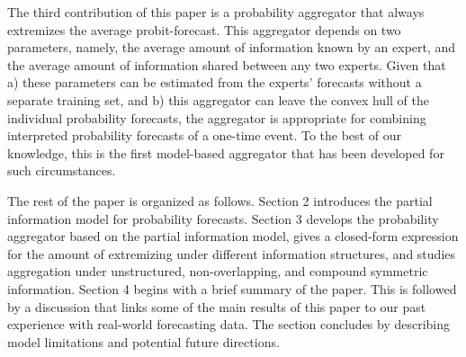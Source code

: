 \documentclass[11pt]{article}
\theoremstyle{definition}
\theoremstyle{definition}
\begin{document}
The third contribution of this paper is a probability aggregator that always extremizes the average probit-forecast. This aggregator depends on two parameters, namely, the average amount of information known by an expert, and the average amount of information shared between any two experts. Given that a) these parameters can be estimated from the experts' forecasts without a separate training set, and b) this aggregator can leave the convex hull of the individual probability forecasts, the aggregator is appropriate for combining interpreted probability forecasts of a one-time event. To the best of our knowledge, this is the first model-based aggregator that has been developed for such circumstances.

 
 
 












The rest of the paper is organized as follows. Section 2 introduces the partial information model for probability forecasts. Section 3 develops the probability aggregator based on the partial information model, gives a closed-form expression for the amount of extremizing under different information structures, and studies aggregation under unstructured, non-overlapping, and compound symmetric information. Section 4 begins with a brief summary of the paper. This is followed by a discussion that links some of the main results of this paper to our past experience with real-world forecasting data. The section concludes by describing model limitations and potential future directions. 
\end{document}
